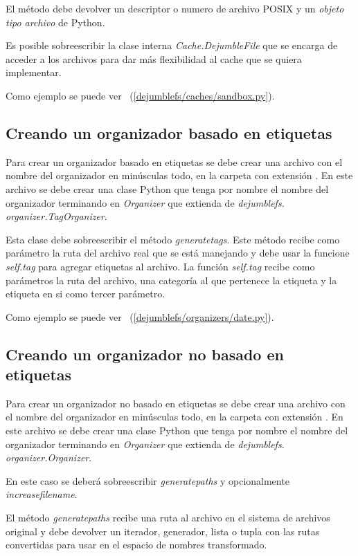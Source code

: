El método debe devolver un descriptor o numero de archivo POSIX y un \textit{objeto tipo archivo} de Python.

Es posible sobreescribir la clase interna \textit{Cache.DejumbleFile} que se encarga de acceder a los archivos para dar más flexibilidad al cache que se quiera implementar. 

Como ejemplo se puede ver ~(\ref{dejumblefs/caches/sandbox.py}).

\subsection{Creando un organizador basado en etiquetas}

Para crear un organizador basado en etiquetas se debe crear una archivo con el nombre del organizador en minúsculas todo, en la carpeta  con extensión . En este archivo se debe crear una clase Python que tenga por nombre el nombre del organizador terminando en \textit{Organizer} que extienda de \textit{dejumblefs. organizer.TagOrganizer}.

Esta clase debe sobreescribir el método \textit{generatetags}. Este método recibe como parámetro la ruta del archivo real que se está manejando y debe usar la funcione \textit{self.tag} para agregar etiquetas al archivo. La función \textit{self.tag} recibe como parámetros la ruta del archivo, una categoría al que pertenece la etiqueta y la etiqueta en si como tercer parámetro.

Como ejemplo se puede ver ~(\ref{dejumblefs/organizers/date.py}).

\subsection{Creando un organizador no basado en etiquetas}

Para crear un organizador no basado en etiquetas se debe crear una archivo con el nombre del organizador en minúsculas todo, en la carpeta  con extensión . En este archivo se debe crear una clase Python que tenga por nombre el nombre del organizador terminando en \textit{Organizer} que extienda de \textit{dejumblefs. organizer.Organizer}.

En este caso se deberá sobreescribir \textit{generatepaths} y opcionalmente \textit{increasefilename}.

El método \textit{generatepaths} recibe una ruta al archivo en el sistema de archivos original y debe devolver un iterador, generador, lista o tupla con las rutas convertidas para usar en el espacio de nombres transformado.

